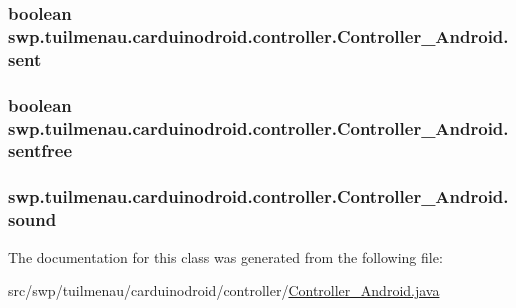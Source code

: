 \subsubsection[{sent}]{\setlength{\rightskip}{0pt plus 5cm}boolean swp.\+tuilmenau.\+carduinodroid.\+controller.\+Controller\+\_\+\+Android.\+sent}\label{classswp_1_1tuilmenau_1_1carduinodroid_1_1controller_1_1_controller___android_a45238bf1102e9589bc83c439e6e28b8e}
\hypertarget{classswp_1_1tuilmenau_1_1carduinodroid_1_1controller_1_1_controller___android_a72efe09e3412212d419018ef46080580}{}
\subsubsection[{sentfree}]{\setlength{\rightskip}{0pt plus 5cm}boolean swp.\+tuilmenau.\+carduinodroid.\+controller.\+Controller\+\_\+\+Android.\+sentfree}\label{classswp_1_1tuilmenau_1_1carduinodroid_1_1controller_1_1_controller___android_a72efe09e3412212d419018ef46080580}
\hypertarget{classswp_1_1tuilmenau_1_1carduinodroid_1_1controller_1_1_controller___android_af52db04dd80233d572b0fd66e1cf224f}{}
\subsubsection[{sound}]{ swp.\+tuilmenau.\+carduinodroid.\+controller.\+Controller\+\_\+\+Android.\+sound}\label{classswp_1_1tuilmenau_1_1carduinodroid_1_1controller_1_1_controller___android_af52db04dd80233d572b0fd66e1cf224f}


The documentation for this class was generated from the following file\+:\begin{DoxyCompactItemize}
\item 
src/swp/tuilmenau/carduinodroid/controller/\hyperlink{_controller___android_8java}{Controller\+\_\+\+Android.\+java}\end{DoxyCompactItemize}
